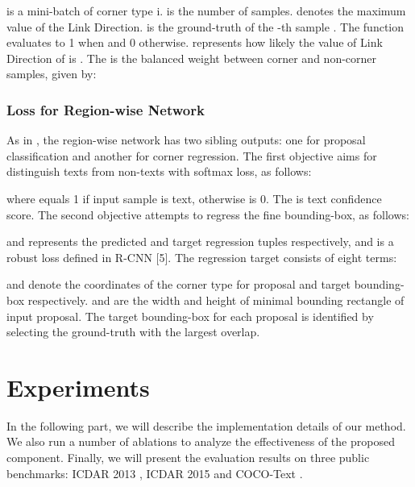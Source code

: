 \documentclass[3p, times]{elsarticle}
\begin{document}
\noindent  is a mini-batch of corner type i.  is the number of samples.  denotes the maximum value of the Link Direction.  is the ground-truth of the -th sample . The function  evaluates to 1 when  and 0 otherwise.  represents how likely the value of Link Direction of  is . The  is the balanced weight between corner and non-corner samples, given by:





\subsubsection{Loss for Region-wise Network}
As in \cite{FASTRCNN2015ICCV}, the region-wise network has two sibling outputs: one for proposal classification and another for corner regression. The first objective aims for distinguish texts from non-texts with softmax loss, as follows:



\noindent where  equals 1 if input sample is text, otherwise is 0. The  is text confidence score. The second objective attempts to regress the fine bounding-box, as follows:



\noindent  and  represents the predicted and target regression tuples respectively, and  is a robust  loss defined in R-CNN [5]. The regression target  consists of eight terms:



\noindent  and  denote the coordinates of the corner type  for proposal and target bounding-box respectively.  and  are the width and height of minimal bounding rectangle of input proposal. The target bounding-box for each proposal is identified by selecting the ground-truth with the largest overlap.





\section{Experiments}
In the following part, we will describe the implementation details of our method. We also run a number of ablations to analyze the effectiveness of the proposed component. Finally, we will present the evaluation results on three public benchmarks: ICDAR 2013 \cite{ICDAR2013}, ICDAR 2015 \cite{ICDAR2015} and COCO-Text \cite{COCO2016ARXIV}.
\end{document}
